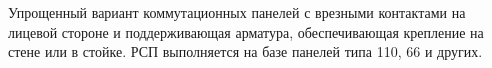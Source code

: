 Упрощенный вариант коммутационных панелей с 
врезными контактами на лицевой стороне и поддерживающая 
арматура, обеспечивающая крепление на стене или в стойке. 
РСП выполняется на базе панелей типа 110, 66 и других.